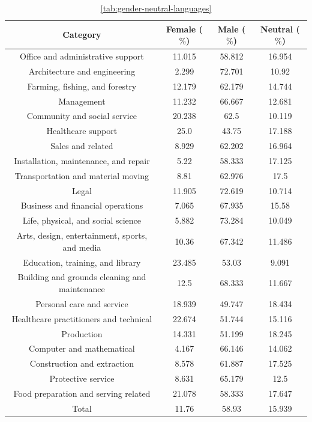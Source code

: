 \documentclass[fleqn,10pt]{article}
\begin{document}
\begin{table}[H]
\centering
\small{
	\begin{tabular}{|c|c|c|c|}
	\hline
	Category & Female ($\%$)	& Male ($\%$)	& Neutral ($\%$) \\ \hline
	\hline
	Office and administrative support & 11.015 & 58.812 & 16.954 \\ \hline
	Architecture and engineering & 2.299 & 72.701 & 10.92 \\ \hline
	Farming, fishing, and forestry & 12.179 & 62.179 & 14.744 \\ \hline
	Management & 11.232 & 66.667 & 12.681 \\ \hline
	Community and social service & 20.238 & 62.5 & 10.119 \\ \hline
	Healthcare support & 25.0 & 43.75 & 17.188 \\ \hline
	Sales and related & 8.929 & 62.202 & 16.964 \\ \hline
	Installation, maintenance, and repair & 5.22 & 58.333 & 17.125 \\ \hline
	Transportation and material moving & 8.81 & 62.976 & 17.5 \\ \hline
	Legal & 11.905 & 72.619 & 10.714 \\ \hline
	Business and financial operations & 7.065 & 67.935 & 15.58 \\ \hline
	Life, physical, and social science & 5.882 & 73.284 & 10.049 \\ \hline
	Arts, design, entertainment, sports, and media & 10.36 & 67.342 & 11.486 \\ \hline
	Education, training, and library & 23.485 & 53.03 & 9.091 \\ \hline
	Building and grounds cleaning and maintenance & 12.5 & 68.333 & 11.667 \\ \hline
	Personal care and service & 18.939 & 49.747 & 18.434 \\ \hline
	Healthcare practitioners and technical & 22.674 & 51.744 & 15.116 \\ \hline
	Production & 14.331 & 51.199 & 18.245 \\ \hline
	Computer and mathematical & 4.167 & 66.146 & 14.062 \\ \hline
	Construction and extraction & 8.578 & 61.887 & 17.525 \\ \hline
	Protective service & 8.631 & 65.179 & 12.5 \\ \hline
	Food preparation and serving related & 21.078 & 58.333 & 17.647 \\ \hline \hline
	Total & 11.76 & 58.93 & 15.939 \\ \hline

	\end{tabular}
	}
    \caption{ \ref{tab:gender-neutral-languages}}
	\label{tab:gender-by-category}
\end{table}
\end{document}
